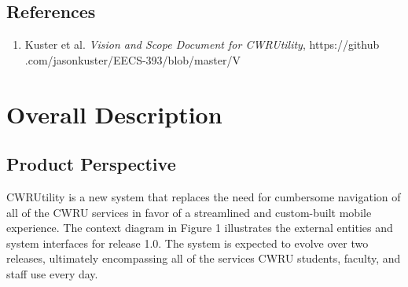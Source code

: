 \documentclass[pdftex,12pt,letter]{article}
\begin{document}
\subsection{References}
\begin{enumerate}[1.]
\item Kuster et al. \emph{Vision and Scope Document for CWRUtility}, https://github\\.com/jasonkuster/EECS-393/blob/master/V%
\end{enumerate}

\section{Overall Description}
\subsection{Product Perspective}
CWRUtility is a new system that replaces the need for cumbersome navigation of all of the CWRU services in favor of a streamlined and custom-built mobile experience. The context diagram in Figure 1 illustrates the external entities and system interfaces for release 1.0. The system is expected to evolve over two releases, ultimately encompassing all of the services CWRU students, faculty, and staff use every day.
\end{document}
